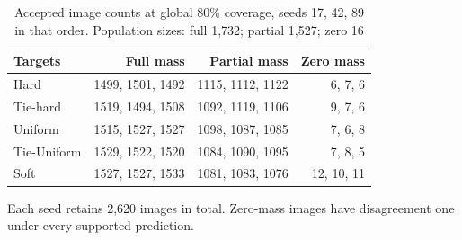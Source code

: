 \begin{table}[t]
\caption{Accepted image counts at global 80\% coverage, seeds 17, 42, 89 in that order. Population sizes: full 1,732; partial 1,527; zero 16}\label{tab:retention}
\centering\begin{tabular}{lrrr}\toprule
Targets & Full mass & Partial mass & Zero mass\\\midrule
Hard & 1499, 1501, 1492 & 1115, 1112, 1122 & 6, 7, 6\\
Tie-hard & 1519, 1494, 1508 & 1092, 1119, 1106 & 9, 7, 6\\
Uniform & 1515, 1527, 1527 & 1098, 1087, 1085 & 7, 6, 8\\
Tie-Uniform & 1529, 1522, 1520 & 1084, 1090, 1095 & 7, 8, 5\\
Soft & 1527, 1527, 1533 & 1081, 1083, 1076 & 12, 10, 11\\
\bottomrule\end{tabular}\par
Each seed retains 2,620 images in total. Zero-mass images have disagreement one under every supported prediction.
\end{table}
